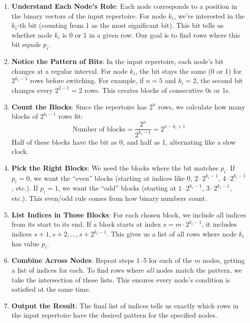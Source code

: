 \documentclass[12pt]{article}
\begin{document}
\begin{enumerate}
    \item \textbf{Understand Each Node’s Role}: Each node corresponds to a position in the binary vectors of the input repertoire. For node \( k_i \), we’re interested in the \( k_i \)-th bit (counting from 1 as the most significant bit). This bit tells us whether node \( k_i \) is 0 or 1 in a given row. Our goal is to find rows where this bit equals \( p_i \).

    \item \textbf{Notice the Pattern of Bits}: In the input repertoire, each node’s bit changes at a regular interval. For node \( k_i \), the bit stays the same (0 or 1) for \( 2^{k_i - 1} \) rows before switching. For example, if \( n = 5 \) and \( k_i = 2 \), the second bit changes every \( 2^{2-1} = 2 \) rows. This creates blocks of consecutive 0s or 1s.

    \item \textbf{Count the Blocks}: Since the repertoire has \( 2^n \) rows, we calculate how many blocks of \( 2^{k_i - 1} \) rows fit:
    \[
    \text{Number of blocks} = \frac{2^n}{2^{k_i - 1}} = 2^{n - k_i + 1}
    \]
    Half of these blocks have the bit as 0, and half as 1, alternating like a slow clock.

    \item \textbf{Pick the Right Blocks}: We need the blocks where the bit matches \( p_i \). If \( p_i = 0 \), we want the ``even'' blocks (starting at indices like 0, \( 2 \cdot 2^{k_i - 1} \), \( 4 \cdot 2^{k_i - 1} \), etc.). If \( p_i = 1 \), we want the ``odd'' blocks (starting at \( 1 \cdot 2^{k_i - 1} \), \( 3 \cdot 2^{k_i - 1} \), etc.). This even/odd rule comes from how binary numbers count.

    \item \textbf{List Indices in Those Blocks}: For each chosen block, we include all indices from its start to its end. If a block starts at index \( s = m \cdot 2^{k_i - 1} \), it includes indices \( s + 1, s + 2, \dots, s + 2^{k_i - 1} \). This gives us a list of all rows where node \( k_i \) has value \( p_i \).

    \item \textbf{Combine Across Nodes}: Repeat steps 1–5 for each of the \( m \) nodes, getting a list of indices for each. To find rows where \textit{all} nodes match the pattern, we take the intersection of these lists. This ensures every node’s condition is satisfied at the same time.

    \item \textbf{Output the Result}: The final list of indices tells us exactly which rows in the input repertoire have the desired pattern for the specified nodes.
\end{enumerate}
\end{document}
